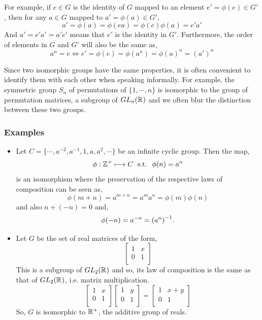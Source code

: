 \documentclass[MathsNotesBase.tex]{subfiles}
\begin{document}
{ For example, if $e \in G$ is the identity of $G$ mapped to an element $ e' = \phi(e) \in G' $, then for any $a \in G$ mapped to $a' = \phi(a) \in G'$,
	\[ a' = \phi(a) = \phi(ea) = \phi(e)\phi(a) = e'a' \]
	And $a' = e'a' = a'e'$ means that $e'$ is the identity in $G'$. Furthermore, the order of elements in $G$ and $G'$ will also be the same as,
	\[ a^n = e \iff e' = \phi(e) = \phi(a^n) = \phi(a)^n = (a')^n \]
	
	Since two isomorphic groups have the same properties, it is often convenient to identify them with each other when speaking informally. For example, the symmetric group $S_n$ of permutations of $\{1,\cdots,n\}$ is isomorphic to the group of permutation matrices, a subgroup of $GL_n(\mathbb{R}^{})$ and we often blur the distinction between these two groups.\\
	

	\subsubsection{Examples}
	\begin{itemize}
		\item{
			Let $C = \{ \cdots, a^{-2}, a^{-1}, 1, a, a^2, \cdots \}$ be an infinite cyclic group. Then the map,
			\[ \phi : \mathbb{Z}^{+} \longmapsto C \; \text{ s.t. } \; \phi(n) = a^n \]
			is an isomorphism where the preservation of the respective laws of composition can be seen as,
			\[ \phi(m + n) = a^{m + n} = a^ma^n = \phi(m)\phi(n) \]
			and also ${ n + (-n) = 0 }$ and,
			\[ \phi(-n) = a^{-n} = {(a^n)}^{-1}. \]
		}
		\item{Let $G$ be the set of real matrices of the form,
			\[
			\begin{bmatrix}
			1 & x 	\\
			0 & 1 	\\
			\end{bmatrix} 
			\]
			This is a subgroup of $GL_2(\mathbb{R}^{})$ and so, its law of composition is the same as that of $GL_2(\mathbb{R}^{})$, i.e. matrix multiplication.
			\[
			\begin{bmatrix}
			1 & x 	\\
			0 & 1 	\\
			\end{bmatrix}
			\begin{bmatrix}
			1 & y 	\\
			0 & 1 	\\
			\end{bmatrix} = 
			\begin{bmatrix}
			1 & x + y\\
			0 & 1 	\\
			\end{bmatrix}
			\]
			So, $G$ is isomorphic to $\mathbb{R}^{+}$, the additive group of reals.
		}
	\end{itemize}
	
}
\end{document}

